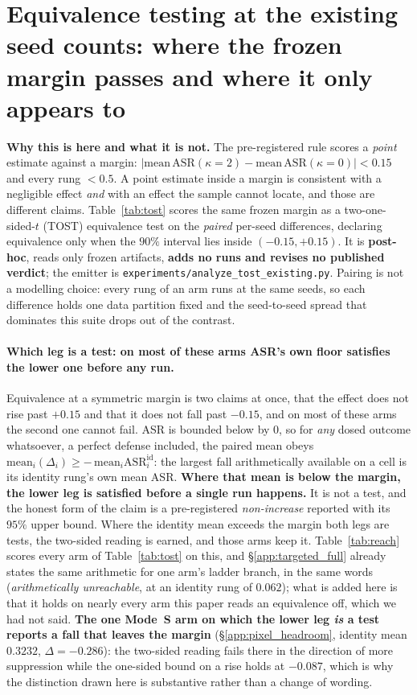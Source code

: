 \documentclass{article}
\begin{document}
\section{Equivalence testing at the existing seed counts: where the frozen margin passes and where it only appears to}
\label{app:tost}

\textbf{Why this is here and what it is not.} The pre-registered rule scores a \emph{point} estimate
against a margin: $|\mathrm{mean}\,\mathrm{ASR}(\kappa{=}2) - \mathrm{mean}\,\mathrm{ASR}(\kappa{=}0)| <
0.15$ and every rung $< 0.5$. A point estimate inside a margin is consistent with a negligible effect
\emph{and} with an effect the sample cannot locate, and those are different claims. Table~\ref{tab:tost}
scores the same frozen margin as a two-one-sided-$t$ (TOST) equivalence test on the \emph{paired}
per-seed differences, declaring equivalence only when the $90\%$ interval lies inside $(-0.15,+0.15)$.
It is \textbf{post-hoc}, reads only frozen artifacts, \textbf{adds no runs and revises no published
verdict}; the emitter is \texttt{experiments/analyze\_tost\_existing.py}. Pairing is not a modelling
choice: every rung of an arm runs at the same seeds, so each difference holds one data partition fixed
and the seed-to-seed spread that dominates this suite drops out of the contrast.

\paragraph{Which leg is a test: on most of these arms ASR's own floor satisfies the lower one before
any run.}
\label{par:reach}
Equivalence at a symmetric margin is two claims at once, that the effect does not rise past $+0.15$ and
that it does not fall past $-0.15$, and on most of these arms the second one cannot fail. ASR is bounded
below by $0$, so for \emph{any} dosed outcome whatsoever, a perfect defense included, the paired mean
obeys $\mathrm{mean}_i(\Delta_i) \ge -\,\mathrm{mean}_i \mathrm{ASR}^{\mathrm{id}}_i$: the largest fall
arithmetically available on a cell is its identity rung's own mean ASR. \textbf{Where that mean is below
the margin, the lower leg is satisfied before a single run happens.} It is not a test, and the honest
form of the claim is a pre-registered \emph{non-increase} reported with its $95\%$ upper bound. Where the
identity mean exceeds the margin both legs are tests, the two-sided reading is earned, and those arms
keep it. Table~\ref{tab:reach} scores every arm of Table~\ref{tab:tost} on this, and §\ref{app:targeted_full}
already states the same arithmetic for one arm's ladder branch, in the same words (\emph{arithmetically
unreachable}, at an identity rung of $0.062$); what is added here is that it holds on nearly every arm
this paper reads an equivalence off, which we had not said. \textbf{The one Mode~S arm on which the
lower leg \emph{is} a test reports a fall that leaves the margin} (§\ref{app:pixel_headroom}, identity
mean $0.3232$, $\Delta = -0.286$): the two-sided reading fails there in the direction of more
suppression while the one-sided bound on a rise holds at $-0.087$, which is why the distinction drawn
here is substantive rather than a change of wording.
\end{document}
